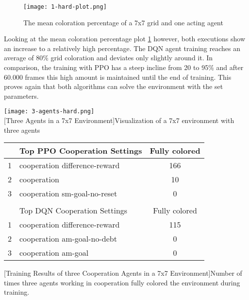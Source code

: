 \begin{figure}[hpbt]
    \centering
    \texttt{[image: 1-hard-plot.png]}\\
    \caption[Mean Coloration Percentage of one Agent in a 7x7 Environment]{The mean coloration percentage of a 7x7 grid and one acting agent}\label{fig:1-hard-plot}
\end{figure}

Looking at the mean coloration percentage plot \ref{fig:1-hard-plot} however, both executions show an increase to a relatively high percentage. The DQN agent training reaches an average of 80\% grid coloration and deviates only slightly around it. In comparison, the training with PPO has a steep incline from 20 to 95\% and after 60.000 frames this high amount is maintained until the end of training. This proves again that both algorithms can solve the environment with the set parameters.


\begin{minipage}{\textwidth}
  \begin{minipage}[b]{0.29\textwidth}
    \centering
    \texttt{[image: 3-agents-hard.png]}\\
    [Three Agents in a 7x7 Environment]{Visualization of a 7x7 environment with three agents}\label{fig:3-hard}
  \end{minipage}
  \hfill
    \begin{minipage}[b]{0.69\textwidth}
    \centering
    \begin{tabular}{clc}\hline
         & Top PPO Cooperation Settings & Fully colored \\ \hline
        {\small1} & cooperation difference-reward & 166 \\
        {\small2} & cooperation & 10 \\
        {\small3} & cooperation sm-goal-no-reset & 0 \\ \hline
         &   \\ \hline
         & Top DQN Cooperation Settings & Fully colored \\ \hline
        {\small 1} & cooperation difference-reward & 115 \\
        {\small 2} & cooperation am-goal-no-debt & 0 \\
        {\small 3} & cooperation am-goal & 0 \\ \hline
        \end{tabular}
        [Training Results of three Cooperation Agents in a 7x7 Environment]{Number of times three agents working in cooperation fully colored the environment during training. \\}\label{t:2-coop-easy}
    \end{minipage}
  \end{minipage}\\\\

